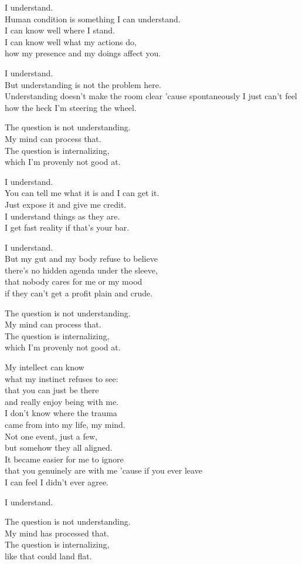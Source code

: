\begin{lyrics}
I understand.\\
Human condition is something I can understand.\\
I can know well where I stand.\\
I can know well what my actions do,\\
how my presence and my doings affect you.

I understand.\\
But understanding is not the problem here.\\
Understanding doesn't make the room clear
'cause spontaneously I just can't feel\\
how the heck I'm steering the wheel.

The question is not understanding.\\
My mind can process that.\\
The question is internalizing,\\
which I'm provenly not good at.

I understand.\\
You can tell me what it is and I can get it.\\
Just expose it and give me credit.\\
I understand things as they are.\\
I get fast reality if that's your bar.

I understand.\\
But my gut and my body refuse to believe\\
there's no hidden agenda under the sleeve,\\
that nobody cares for me or my mood\\
if they can't get a profit plain and crude.

The question is not understanding.\\
My mind can process that.\\
The question is internalizing,\\
which I'm provenly not good at.

My intellect can know\\
what my instinct refuses to see:\\
that you can just be there\\
and really enjoy being with me.\\
I don't know where the trauma\\
came from into my life, my mind.\\
Not one event, just a few,\\
but somehow they all aligned.\\
It became easier for me to ignore\\
that you genuinely are with me
'cause if you ever leave\\
I can feel I didn't ever agree.

I understand.

The question is not understanding.\\
My mind has processed that.\\
The question is internalizing,\\
like that could land flat.
\end{lyrics}

